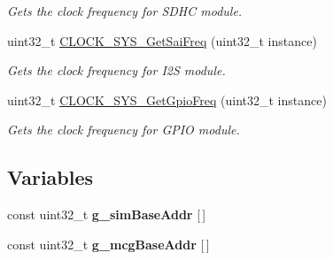 \begin{DoxyCompactItemize}
\begin{DoxyCompactList}\small\item\em Gets the clock frequency for S\+D\+HC module. \end{DoxyCompactList}\item 
uint32\+\_\+t \hyperlink{group__clock__manager_ga38b227a0f0548511887ec74003a79df7}{C\+L\+O\+C\+K\+\_\+\+S\+Y\+S\+\_\+\+Get\+Sai\+Freq} (uint32\+\_\+t instance)
\begin{DoxyCompactList}\small\item\em Gets the clock frequency for I2S module. \end{DoxyCompactList}\item 
uint32\+\_\+t \hyperlink{group__clock__manager_ga5ba6b52196ef98942b22b0e51eaf7057}{C\+L\+O\+C\+K\+\_\+\+S\+Y\+S\+\_\+\+Get\+Gpio\+Freq} (uint32\+\_\+t instance)
\begin{DoxyCompactList}\small\item\em Gets the clock frequency for G\+P\+IO module. \end{DoxyCompactList}\end{DoxyCompactItemize}
\subsection*{Variables}
\begin{DoxyCompactItemize}
\item 
const uint32\+\_\+t {\bfseries g\+\_\+sim\+Base\+Addr} \mbox{[}$\,$\mbox{]}\hypertarget{group__clock__manager_gac2bce4abd4299d1d01d429b59d5df257}{}\label{group__clock__manager_gac2bce4abd4299d1d01d429b59d5df257}

\item 
const uint32\+\_\+t {\bfseries g\+\_\+mcg\+Base\+Addr} \mbox{[}$\,$\mbox{]}\hypertarget{group__clock__manager_ga6abca99af0f37c66709fb8d282a23975}{}\label{group__clock__manager_ga6abca99af0f37c66709fb8d282a23975}

\end{DoxyCompactItemize}

